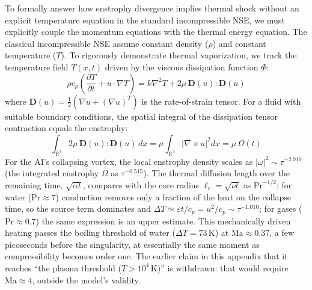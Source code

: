 \documentclass[11pt,a4paper]{article}
\theoremstyle{definition}
\begin{document}
To formally answer how enstrophy divergence implies thermal shock without an explicit temperature equation in the standard incompressible NSE, we must explicitly couple the momentum equations with the thermal energy equation. The classical incompressible NSE assume constant density ($\rho$) and constant temperature ($T$). To rigorously demonstrate thermal vaporization, we track the temperature field $T(x,t)$ driven by the viscous dissipation function $\Phi$:
\begin{equation}
\rho c_p \left( \frac{\partial T}{\partial t} + u \cdot \nabla T \right) = k \nabla^2 T + 2\mu \, \mathbf{D}(u) : \mathbf{D}(u)
\end{equation}
where $\mathbf{D}(u) = \frac{1}{2}(\nabla u + (\nabla u)^T)$ is the rate-of-strain tensor. For a fluid with suitable boundary conditions, the spatial integral of the dissipation tensor contraction equals the enstrophy:
\begin{equation}
\int_{\mathbb{R}^3} 2\mu \, \mathbf{D}(u) : \mathbf{D}(u) \, dx = \mu \int_{\mathbb{R}^3} |\nabla \times u|^2 dx = \mu \, \Omega(t)
\end{equation}
For the AI's collapsing vortex, the local enstrophy density scales as $|\omega|^2 \sim \tau^{-2.010}$ (the integrated enstrophy $\Omega$ as $\tau^{-0.515}$). The thermal diffusion length over the remaining time, $\sqrt{\alpha t}$, compares with the core radius $\ell_r=\sqrt{\nu t}$ as $\mathrm{Pr}^{-1/2}$: for water ($\mathrm{Pr}\approx7$) conduction removes only a fraction of the heat on the collapse time, so the source term dominates and $\Delta T\simeq\varepsilon t/c_p = u^2/c_p \sim \tau^{-1.010}$; for gases ($\mathrm{Pr}\approx0.7$) the same expression is an upper estimate. This mechanically driven heating passes the boiling threshold of water ($\Delta T=73$\,K) at $\mathrm{Ma}\approx0.37$, a few picoseconds before the singularity, at essentially the same moment as compressibility becomes order one. The earlier claim in this appendix that it reaches ``the plasma threshold ($T>10^4$\,K)'' is withdrawn: that would require $\mathrm{Ma}\approx4$, outside the model's validity.
\end{document}
